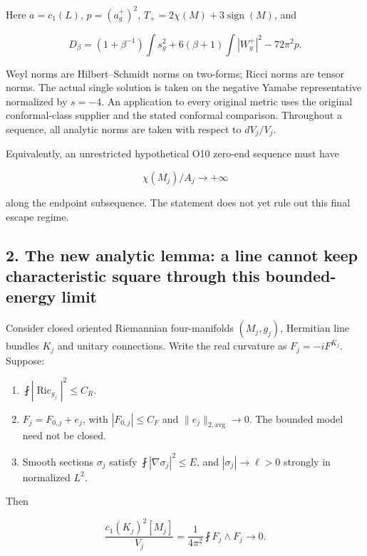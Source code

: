 \documentclass[11pt]{article}
\providecommand{\tightlist}{\setlength{\itemsep}{0pt}\setlength{\parskip}{0pt}}
\begin{document}
Here \(a=c_1(L)\), \(p=(a_g^+)^2\),
\(T_+=2\chi(M)+3\operatorname{sign}(M)\), and

\[
 D_\beta=(1+\beta^{-1})\int s_g^2
 +6(\beta+1)\int|W_g^+|^2-72\pi^2p.
\]

Weyl norms are Hilbert--Schmidt norms on two-forms; Ricci norms are
tensor norms. The actual single solution is taken on the negative Yamabe
representative normalized by \(s=-4\). An application to every original
metric uses the original conformal-class supplier and the stated
conformal comparison. Throughout a sequence, all analytic norms are
taken with respect to \(dV_j/V_j\).

Equivalently, an unrestricted hypothetical O10 zero-end sequence must
have

\[
 \boxed{\chi(M_j)/A_j\longrightarrow+\infty}
\tag{2}
\]

along the endpoint subsequence. The statement does not yet rule out this
final escape regime.

\hypertarget{the-new-analytic-lemma-a-line-cannot-keep-characteristic-square-through-this-bounded-energy-limit}{%
\subsection{2. The new analytic lemma: a line cannot keep characteristic
square through this bounded-energy
limit}\label{the-new-analytic-lemma-a-line-cannot-keep-characteristic-square-through-this-bounded-energy-limit}}

Consider closed oriented Riemannian four-manifolds \((M_j,g_j)\),
Hermitian line bundles \(K_j\) and unitary connections. Write the real
curvature as \(F_j=-iF^{K_j}\). Suppose:

\begin{enumerate}
\def\labelenumi{\arabic{enumi}.}
\tightlist
\item
  \(\fint|\operatorname{Ric}_{g_j}|^2\le C_R\).
\item
  \(F_j=F_{0,j}+e_j\), with \(|F_{0,j}|\le C_F\) and
  \(\|e_j\|_{2,\mathrm{avg}}\to0\). The bounded model need not be
  closed.
\item
  Smooth sections \(\sigma_j\) satisfy \(\fint|\nabla\sigma_j|^2\le E\),
  and \(|\sigma_j|\to\ell>0\) strongly in normalized \(L^2\).
\end{enumerate}

Then

\[
 \boxed{\frac{c_1(K_j)^2[M_j]}{V_j}
 =\frac1{4\pi^2}\fint F_j\wedge F_j\longrightarrow0.}
\tag{3}
\]
\end{document}
